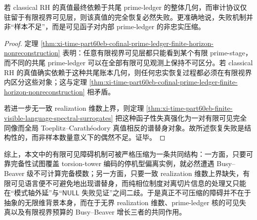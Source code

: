 \begin{corollary}[视界--账本分离原则]\label{cor:xi-time-part60eb-horizon-ledger-separation-principle}
若 classical RH 的真值最终依赖于共尾 prime-ledger 的整体几何，而审计协议仅驻留于有限视界可见层，则该真值的完全恢复必然失败。更准确地说，失败机制并非“样本不足”，而是可见函子对内部 prime-ledger 的非忠实压缩。
\end{corollary}
\begin{proof}
定理 \ref{thm:xi-time-part60eb-cofinal-prime-ledger-finite-horizon-nonreconstruction} 表明：任意有限视界可见层都只能看到某个有限 prime-stage，而不同的共尾 prime-ledger 可以在全部有限可见观测上保持不可区分。若 classical RH 的真值确实依赖于这种共尾账本几何，则任何忠实恢复过程都必须在有限视界内区分这些对象；这与定理 \ref{thm:xi-time-part60eb-cofinal-prime-ledger-finite-horizon-nonreconstruction} 相矛盾。

若进一步无一致 realization 维数上界，则定理 \ref{thm:xi-time-part60eb-finite-visible-language-spectral-surrogates} 把这种函子性失真强化为一对有限可见完全同像而全局 Toeplitz--Carath\'eodory 真值相反的谱替身对象。故所述恢复失败是结构性的，而非样本数量意义下的偶然不足。证毕。
\end{proof}

\noindent
综上，本文中的有限可见障碍机制可被严格压缩为一条共同结构：一方面，只要可靠完备性试图覆盖 torsion-tower 编码的停机型偏离实例，就必然遭遇 Busy--Beaver 级不可计算完备模数；另一方面，只要一致 realization 维数上界缺失，有限可见语言便不可避免地出现谱替身，而纯相位制度对离切片信息的处理又只能在“模式轴外延”与“\(\mathsf{NULL}\) 失败见证”之间二歧。于是真正不可压缩的障碍并不在于抽象的无限维背景本身，而在于无界 realization 维数、prime-ledger 核的可见失真以及有限视界预算的 Busy--Beaver 增长三者的共同作用。

\endinput
